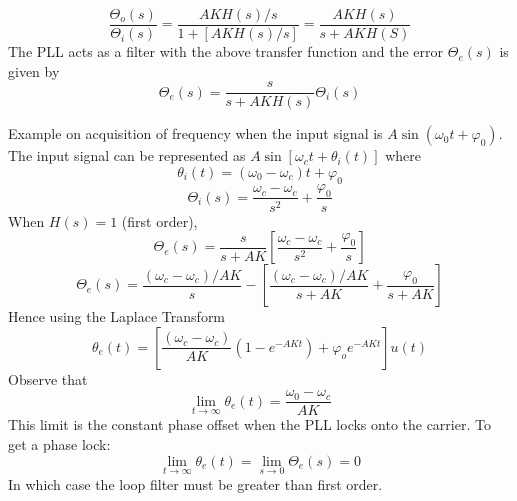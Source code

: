 \documentclass{article}
\begin{document}
    \begin{equation}
        \frac{\Theta_o(s)}{\Theta_i(s)} = \frac{AKH(s)/s}{1 + {[AKH(s)/s]}} = \frac{AKH(s)}{s+AKH(S)}
    \end{equation}
    The PLL acts as a filter with the above transfer function and the error $\Theta_e(s)$ is given by
    \begin{equation}
        \Theta_e(s) = \frac{s}{s + AKH(s)}\Theta_i(s)
    \end{equation}

    Example on acquisition of frequency when the input signal is $A\sin(\omega_0t + \varphi_0)$. The input signal can be represented as $A\sin[\omega_ct + 
    \theta_i(t)]$ where 
    \begin{equation}
        \theta_i(t) = (\omega_0 - \omega_c)t + \varphi_0
    \end{equation}
    \begin{equation}
        \Theta_i(s) = \frac{\omega_c - \omega_c}{s^2} + \frac{\varphi_0}{s}
    \end{equation}
    When $H(s) = 1$ (first order),
    \begin{equation}
        \Theta_e(s) = \frac{s}{s + AK} [\frac{\omega_c - \omega_c}{s^2} + \frac{\varphi_0}{s}]
    \end{equation}
    \begin{equation}
        \Theta_e(s) = \frac{(\omega_c - \omega_c)/AK}{s} - [\frac{(\omega_c - \omega_c)/AK}{s+AK} + \frac{\varphi_0}{s+AK}]
    \end{equation}
    Hence using the Laplace Transform 
    \begin{equation}
        \theta_e(t) = [\frac{(\omega_c - \omega_c)}{AK}(1-e^{-AKt}) + \varphi_oe^{-AKt}]u(t)
    \end{equation}
    Observe that 
    \begin{equation}
        \lim_{t\rightarrow \infty} \theta_e(t) = \frac{\omega_0 -\omega_c}{AK}
    \end{equation}
    This limit is the constant phase offset when the PLL locks onto the carrier. To get a phase lock:
    \begin{equation}
        \lim_{t\rightarrow \infty} \theta_e(t) = \lim_{s\rightarrow 0} \Theta_e(s) = 0
    \end{equation}
    In which case the loop filter must be greater than first order. 
\end{document}

